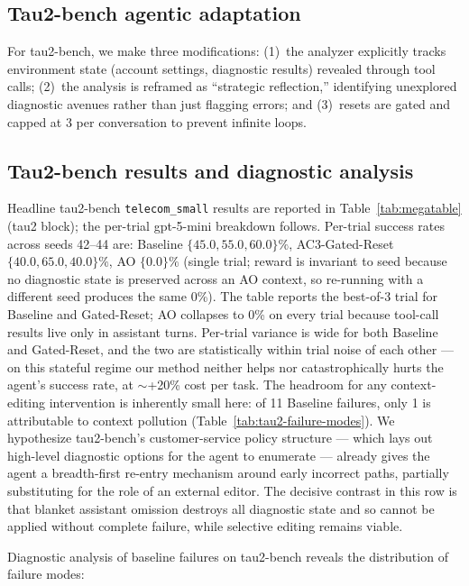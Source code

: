 \documentclass{article}
\newcommand{\method}{AC3\xspace}
\begin{document}
\subsection{Tau2-bench agentic adaptation}
\label{app:agentic-methods}

For tau2-bench, we make three modifications: (1)~the analyzer explicitly tracks environment state (account settings, diagnostic results) revealed through tool calls; (2)~the analysis is reframed as ``strategic reflection,'' identifying unexplored diagnostic avenues rather than just flagging errors; and (3)~resets are gated and capped at 3 per conversation to prevent infinite loops.

\subsection{Tau2-bench results and diagnostic analysis}
\label{app:tau2-diagnostic}

Headline tau2-bench \texttt{telecom\_small} results are reported in Table~\ref{tab:megatable} (tau2 block); the per-trial gpt-5-mini breakdown follows. Per-trial success rates across seeds 42--44 are: Baseline $\{45.0, 55.0, 60.0\}\%$, \method-Gated-Reset $\{40.0, 65.0, 40.0\}\%$, AO $\{0.0\}\%$ (single trial; reward is invariant to seed because no diagnostic state is preserved across an AO context, so re-running with a different seed produces the same 0\%). The table reports the best-of-3 trial for Baseline and Gated-Reset; AO collapses to 0\% on every trial because tool-call results live only in assistant turns. Per-trial variance is wide for both Baseline and Gated-Reset, and the two are statistically within trial noise of each other --- on this stateful regime our method neither helps nor catastrophically hurts the agent's success rate, at $\sim$+20\% cost per task. The headroom for any context-editing intervention is inherently small here: of 11 Baseline failures, only 1 is attributable to context pollution (Table~\ref{tab:tau2-failure-modes}). We hypothesize tau2-bench's customer-service policy structure --- which lays out high-level diagnostic options for the agent to enumerate --- already gives the agent a breadth-first re-entry mechanism around early incorrect paths, partially substituting for the role of an external editor. The decisive contrast in this row is that blanket assistant omission destroys all diagnostic state and so cannot be applied without complete failure, while selective editing remains viable.

Diagnostic analysis of baseline failures on tau2-bench reveals the distribution of failure modes:
\end{document}
